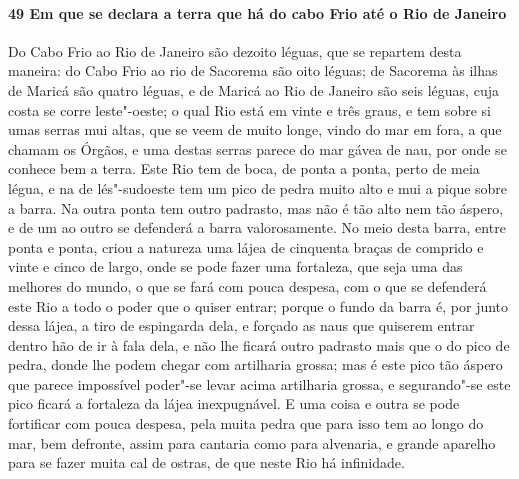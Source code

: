 \begin{linenumbers}
\paragraph{49 Em que se declara a terra que há do cabo Frio até o Rio de Janeiro} \quad
Do Cabo Frio ao Rio de Janeiro são dezoito léguas, que se repartem desta maneira: do Cabo
Frio ao rio de Sacorema são oito léguas; de Sacorema às ilhas de Maricá são quatro léguas,
e de Maricá ao Rio de Janeiro são seis léguas, cuja costa se corre leste"-oeste; o qual Rio
está em vinte e três graus, e tem sobre si umas serras mui altas, que se veem de muito
longe, vindo do mar em fora, a que chamam os Órgãos, e uma destas serras parece do mar
gávea de nau, por onde se conhece bem a terra. Este Rio tem de boca, de ponta a ponta,
perto de meia légua, e na de lés"-sudoeste tem um pico de pedra muito alto e mui a pique
sobre a barra. Na outra ponta tem outro padrasto, mas não é tão alto nem tão áspero, e de
um ao outro se defenderá a barra valorosamente. No meio desta barra, entre ponta e ponta,
criou a natureza uma lájea de cinquenta braças de comprido e vinte e cinco de largo, onde
se pode fazer uma fortaleza, que seja uma das melhores do mundo, o que se fará com pouca
despesa, com o que se defenderá este Rio a todo o poder que o quiser entrar; porque o
fundo da barra é, por junto dessa lájea, a tiro de espingarda dela, e forçado as naus que
quiserem entrar dentro hão de ir à fala dela, e não lhe ficará outro padrasto mais que o
do pico de pedra, donde lhe podem chegar com artilharia grossa; mas é este pico tão áspero
que parece impossível poder"-se levar acima artilharia grossa, e segurando"-se este pico
ficará a fortaleza da lájea inexpugnável. E uma coisa e outra se pode fortificar com pouca
despesa, pela muita pedra que para isso tem ao longo do mar, bem defronte, assim para
cantaria como para alvenaria, e grande aparelho para se fazer muita cal de ostras, de que
neste Rio há infinidade.


\end{linenumbers}
